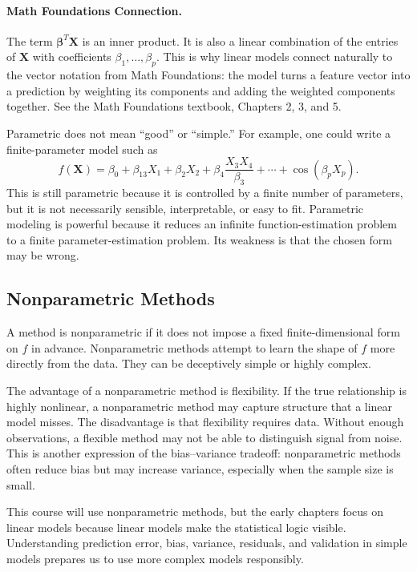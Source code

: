 {\paragraph{Math Foundations Connection.}
The term $\boldsymbol{\beta}^T\mathbf{X}$ is an inner product.  It is also a linear combination of the entries of $\mathbf{X}$ with coefficients $\beta_1,\ldots,\beta_p$.  This is why linear models connect naturally to the vector notation from Math Foundations: the model turns a feature vector into a prediction by weighting its components and adding the weighted components together.  See the Math Foundations textbook, Chapters 2, 3, and 5.

Parametric does not mean ``good'' or ``simple.''  For example, one could write a finite-parameter model such as
\[
  f(\mathbf{X})
  = \beta_0 + \beta_{13}X_1 + \beta_2X_2
  + \beta_4\frac{X_3X_4}{\beta_3}
  + \cdots + \cos(\beta_pX_p).
\]
This is still parametric because it is controlled by a finite number of parameters, but it is not necessarily sensible, interpretable, or easy to fit.  Parametric modeling is powerful because it reduces an infinite function-estimation problem to a finite parameter-estimation problem.  Its weakness is that the chosen form may be wrong.

\subsection{Nonparametric Methods}

A method is nonparametric if it does not impose a fixed finite-dimensional form on $f$ in advance.  Nonparametric methods attempt to learn the shape of $f$ more directly from the data.  They can be deceptively simple or highly complex.

The advantage of a nonparametric method is flexibility.  If the true relationship is highly nonlinear, a nonparametric method may capture structure that a linear model misses.  The disadvantage is that flexibility requires data.  Without enough observations, a flexible method may not be able to distinguish signal from noise.  This is another expression of the bias--variance tradeoff: nonparametric methods often reduce bias but may increase variance, especially when the sample size is small.

This course will use nonparametric methods, but the early chapters focus on linear models because linear models make the statistical logic visible.  Understanding prediction error, bias, variance, residuals, and validation in simple models prepares us to use more complex models responsibly.

}
